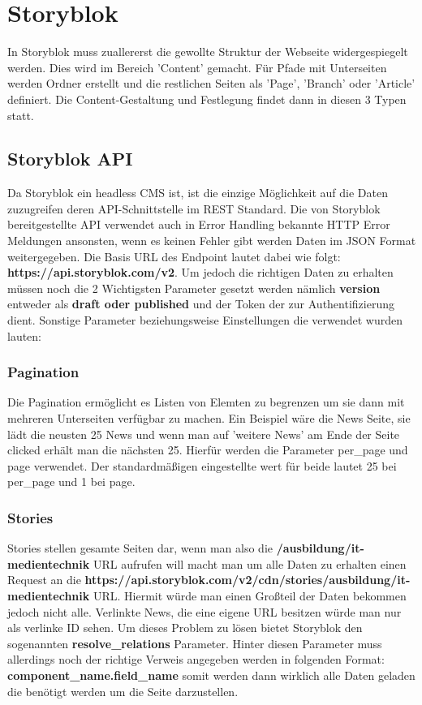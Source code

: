 

\section{Storyblok}

In Storyblok muss zuallererst die gewollte Struktur der Webseite widergespiegelt werden. Dies wird im Bereich 'Content' gemacht. 
Für Pfade mit Unterseiten werden Ordner erstellt und die restlichen Seiten  als 'Page', 'Branch' oder 'Article' definiert.
Die Content-Gestaltung und Festlegung findet dann in diesen 3 Typen statt. 


\subsection{Storyblok API}
Da Storyblok ein headless CMS ist, ist die einzige Möglichkeit auf die Daten zuzugreifen deren API-Schnittstelle im REST Standard. 
Die von Storyblok bereitgestellte API verwendet auch in Error Handling bekannte HTTP Error Meldungen ansonsten, wenn es keinen Fehler gibt werden Daten im JSON Format weitergegeben. 
Die Basis URL des Endpoint lautet dabei wie folgt: \textbf{https://api.storyblok.com/v2}. Um jedoch die richtigen Daten zu erhalten müssen noch die 2 Wichtigsten Parameter gesetzt werden nämlich \textbf{version} entweder als \textbf{draft oder published} und der Token der zur Authentifizierung dient.
Sonstige Parameter beziehungsweise Einstellungen die verwendet wurden lauten:

\subsubsection*{Pagination}
Die Pagination ermöglicht es Listen von Elemten zu begrenzen um sie dann mit mehreren Unterseiten verfügbar zu machen. Ein Beispiel wäre die News Seite, sie lädt die neusten 25 News und wenn man auf 'weitere News' am Ende der Seite clicked erhält man die nächsten 25.
Hierfür werden die Parameter per\_page und page verwendet. Der standardmäßigen eingestellte wert für beide lautet 25 bei per\_page und 1 bei page.

\subsubsection*{Stories}
Stories stellen gesamte Seiten dar, wenn man also die \textbf{/ausbildung/it-medientechnik} URL aufrufen will macht man um alle Daten zu erhalten einen Request an die \textbf{https://api.storyblok.com/v2/cdn/stories/ausbildung/it-medientechnik} URL. 
Hiermit würde man einen Großteil der Daten bekommen jedoch nicht alle. Verlinkte News, die eine eigene URL besitzen würde man nur als verlinke ID sehen. Um dieses Problem zu lösen bietet Storyblok den sogenannten  \textbf{resolve\_relations} Parameter. Hinter diesen Parameter muss allerdings noch der richtige Verweis angegeben werden in folgenden Format: \textbf{component\_name.field\_name} somit werden dann wirklich alle Daten geladen die benötigt werden um die Seite darzustellen.

